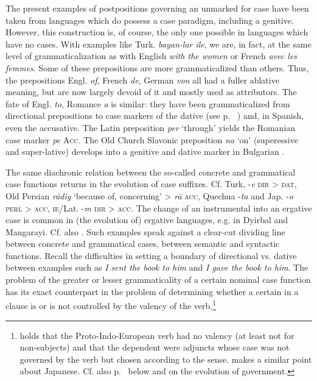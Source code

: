 \label{page88}The present examples of postpositions governing an \np unmarked for case have been taken from languages which do possess a case paradigm, including a genitive. However, this construction is, of course, the only one possible in languages which have no cases. With examples like Turk. \textit{bayan-lar ile}, we are, in fact, at the same level of grammaticalization as with English \textit{with the women} or French \textit{avec les femmes}. Some of these prepositions are more grammaticalized than others. Thus, the prepositions Engl. \textit{of}, French \textit{de}, German \textit{von} all had a fuller ablative meaning, but are now largely devoid of it and mostly used as attributors. The fate of Engl. \textit{to}, Romance \textit{a} is similar: they have been grammaticalized from directional prepositions to case markers of the dative (see p.~\pageref{page100}\chk%
)  and, in Spanish, even the accusative. The Latin preposition \textit{per} ‘through’ yields the Romanian case marker \textit{pe} \textsc{Acc}. The Old Church Slavonic preposition \textit{na} ‘on’ (superessive and super-lative) develops into a genitive and dative marker in Bulgarian \citep{Qvonje1979}.

The same diachronic relation between the so-called concrete and grammatical case functions returns in the evolution of case suffixes. Cf. Turk, -\textit{e} \textsc{dir} {\textgreater} \textsc{dat}, Old Persian \textit{r\=adiy} ‘because of, concerning’ {\textgreater} \textit{r\=a} \textsc{acc}, Quechua -\textit{ta} and Jap. -\textit{o} \textsc{perl} {\textgreater} \textsc{acc}, \textsc{ie}/Lat. -\textit{m} \textsc{dir} {\textgreater} \textsc{acc}. The change of an instrumental into an ergative case is common in (the evolution of) ergative languages, e.g. in Dyirbal and Mangarayi. Cf. also . Such examples speak against a clear-cut dividing line between concrete and grammatical cases, between semantic and syntactic functions. Recall the difficulties in setting a boundary of directional vs. dative between examples such as \textit{I sent the book to him} and \textit{I gave the book to him}. The problem of the greater or lesser grammaticality of a certain nominal case function has its exact counterpart in the problem of determining whether a certain \np in a clause is or is not controlled by the valency of the verb.\footnote{\citet[357--359]{Meillet1934} holds that the Proto-Indo-European verb had no valency (at least not for non-subjects) and that the dependent \nps were adjuncts whose case was not governed by the verb but chosen according to the sense. \citet{Coseriu1979} makes a similar point about Japanese. Cf. also p.~\pageref{page101} below and \citet[§4.2]{Lehmann1983} on the evolution of government.}

